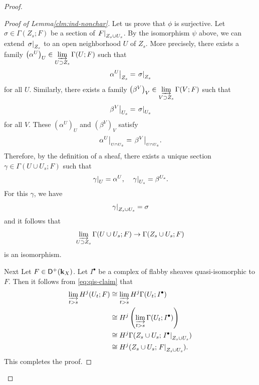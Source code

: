 \begin{proof}
\begin{proof}[Proof of Lemma\ref{clm:ind-nonchar}]
    Let us prove that \(\phi\) is surjective. 
    Let \(\sigma\in \Gamma(Z_{s};F)\) be 
    a section of \(\mres[F]{Z_{s}\cup U_{s}}\). 
    By the isomorphism \(\psi\) above, 
    we can extend \(\mres[\sigma]{Z_{s}}\) to 
    an open neighborhood \(U\) of \(Z_{s}\). 
    More precisely, there exists a family \(
      \left(\alpha^{U}\right)_{U}
      \in 
      \indlim[U\supset Z_{s}]\Gamma(U;F)
    \) such that \[
      \mres[\alpha^{U}]{Z_{s}}=\mres[\sigma]{Z_{s}}
    \] for all \(U\). 
    Similarly, there exists a family \(
      \left(\beta^{V}\right)_{V}
      \in 
      \indlim[V\supset Z_{s}]\Gamma(V;F)
    \) such that \[
      \mres[\beta^{V}]{U_{s}}=\mres[\sigma]{U_{s}}
    \] for all \(V\). 
    These \((\alpha^{U})_{U}\) and \((\beta^{V})_{V}\) satisfy
    \[
      \mres[\alpha^{U}]{_{U\cap U_{s}}}
      =
      \mres[\beta^{V}]{_{U\cap U_{s}}}. 
    \]
    Therefore, by the definition of a sheaf, 
    there exists a unique section \(
      \gamma\in\Gamma(U\cup U_{s};F)
    \) such that \[
      \mres[\gamma]{U} =\alpha^{U},
      \quad
      \mres[\gamma]{U_{s}}= \beta^{U_{s}}.
    \]
    For this \(\gamma\), we have \[
      \mres[\gamma]{Z_{s}\cup U_{s}}=\sigma
    \]
    and it follows that 
    \[
      \indlim[U\supset Z_{s}]
      \Gamma(U\cup U_{s};F)
      \to
      \Gamma(Z_{s}\cup U_{s};F)
    \]
    is an isomorphism. 

    Next Let \(F\in\Dompl(\kk_X)\). 
    Let \(I^{\bm{\bullet}}\) be a complex of flabby sheaves 
    quasi-isomorphic to \(F\). 
    Then  it follows from \eqref{eq:qis-claim} that 
    \begin{align*}
      \indlim[t>s]H^{j}(U_t;F)
      &\cong 
      \indlim[t>s]H^{j}\Gamma(U_t;I^{\bullet})\\
      &\cong 
      H^{j}\left(\indlim[t>s]\Gamma(U_t;I^{\bullet})\right)\\
      &\cong
      H^{j}\Gamma(
        Z_{s}\cup U_{s};
        \mres[I^{\bullet}]{Z_{s}\cup U_{s}})\\
      &\cong
      H^{j}(Z_{s}\cup U_{s};\mres[F]{Z_{s}\cup U_{s}}).
    \end{align*}
    This completes the proof.
  \end{proof}


\end{proof}
